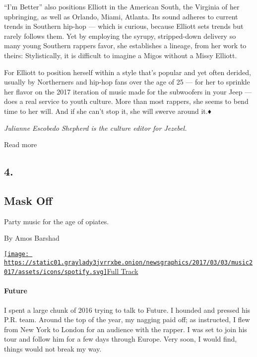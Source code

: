 ``I'm Better'' also positions Elliott in the American South, the
Virginia of her upbringing, as well as Orlando, Miami, Atlanta. Its
sound adheres to current trends in Southern hip-hop --- which is
curious, because Elliott sets trends but rarely follows them. Yet by
employing the syrupy, stripped-down delivery so many young Southern
rappers favor, she establishes a lineage, from her work to theirs:
Stylistically, it is difficult to imagine a Migos without a Missy
Elliott.

For Elliott to position herself within a style that's popular and yet
often derided, usually by Northerners and hip-hop fans over the age of
25 --- for her to sprinkle her flavor on the 2017 iteration of music
made for the subwoofers in your Jeep --- does a real service to youth
culture. More than most rappers, she seems to bend time to her will. And
if she can't stop it, she will swerve around it.♦

\emph{Julianne Escobedo Shepherd is the culture editor for Jezebel.}

Read more

\hypertarget{4}{%
\subsection{4.}\label{4}}

\hypertarget{--mask-off}{%
\subsection{\texorpdfstring{ Mask Off}{  Mask Off}}\label{--mask-off}}

Party music for the age of opiates.

By Amos Barshad

\href{https://open.spotify.com/track/3rOSwuTsUlJp0Pu0MkN8r8}{\texttt{[image: https://static01.graylady3jvrrxbe.onion/newsgraphics/2017/03/03/music2017/assets/icons/spotify.svg]}Full
Track}

\hypertarget{future}{%
\paragraph{Future}\label{future}}

I spent a large chunk of 2016 trying to talk to Future. I hounded and
pressed his P.R. team. Around the top of the year, my nagging paid off;
as instructed, I flew from New York to London for an audience with the
rapper. I was set to join his tour and follow him for a few days through
Europe. Very soon, I would find, things would not break my way.

